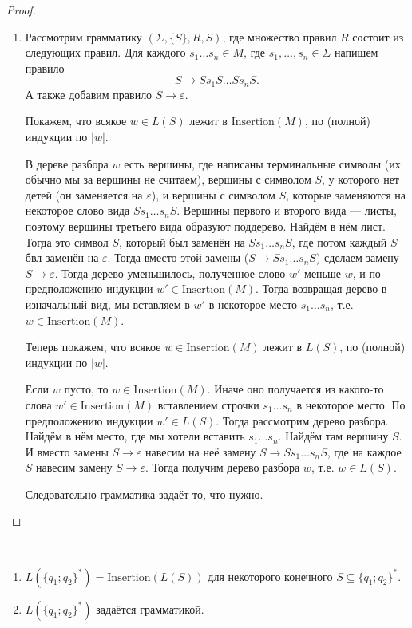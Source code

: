 \documentclass[12pt,a4paper]{article}
\newcommand{\Insertion}{\mathrm{Insertion}}
\begin{document}
\begin{problem}{8}
\begin{enumerate}
\begin{proof}
\begin{enumerate}
                        \item Рассмотрим грамматику $(\Sigma, \{S\}, R, S)$, где множество правил $R$ состоит из следующих правил. Для каждого $s_1 \dots s_n \in M$, где $s_1, \dots, s_n \in \Sigma$ напишем правило
                            \[S \to S s_1 S \dots S s_n S.\]
                            А также добавим правило $S \to \varepsilon$.

                            Покажем, что всякое $w \in L(S)$ лежит в $\Insertion(M)$, по (полной) индукции по $|w|$.

                            В дереве разбора $w$ есть вершины, где написаны терминальные символы (их обычно мы за вершины не считаем), вершины с символом $S$, у которого нет детей (он заменяется на $\varepsilon$), и вершины с символом $S$, которые заменяются на некоторое слово вида $S s_1 \dots s_n S$. Вершины первого и второго вида --- листы, поэтому вершины третьего вида образуют поддерево. Найдём в нём лист. Тогда это символ $S$, который был заменён на $S s_1 \dots s_n S$, где потом каждый $S$ бвл заменён на $\varepsilon$. Тогда вместо этой замены ($S \to S s_1 \dots s_n S$) сделаем замену $S \to \varepsilon$. Тогда дерево уменьшилось, полученное слово $w'$ меньше $w$, и по предположению индукции $w' \in \Insertion(M)$. Тогда возвращая дерево в изначальный вид, мы вставляем в $w'$ в некоторое место $s_1 \dots s_n$, т.е. $w \in \Insertion(M)$.

                            Теперь покажем, что всякое $w \in \Insertion(M)$ лежит в $L(S)$, по (полной) индукции по $|w|$.

                            Если $w$ пусто, то $w \in \Insertion(M)$. Иначе оно получается из какого-то слова $w' \in \Insertion(M)$ вставлением строчки $s_1 \dots s_n$ в некоторое место. По предположению индукции $w' \in L(S)$. Тогда рассмотрим дерево разбора. Найдём в нём место, где мы хотели вставить $s_1 \dots s_n$. Найдём там вершину $S$. И вместо замены $S \to \varepsilon$ навесим на неё замену $S \to S s_1 \dots s_n S$, где на каждое $S$ навесим замену $S \to \varepsilon$. Тогда получим дерево разбора $w$, т.е. $w \in L(S)$.

                            Следовательно грамматика задаёт то, что нужно.
                    \end{enumerate}
                \end{proof}

                \begin{corollary}\ 
                    \begin{enumerate}
                        \item $L(\{q_1; q_2\}^*) = \Insertion(L(S))$ для некоторого конечного $S \subseteq \{q_1; q_2\}^*$.
                        \item $L(\{q_1; q_2\}^*)$ задаётся грамматикой.
                    \end{enumerate}
                \end{corollary}


\end{enumerate}
\end{problem}
\end{document}
